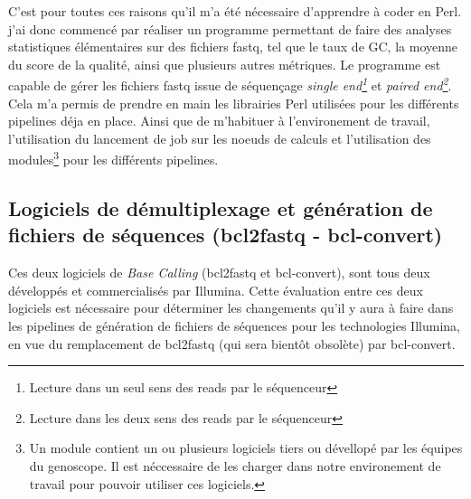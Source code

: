 C'est pour toutes ces raisons qu'il m'a été nécessaire d'apprendre à coder en Perl. j'ai donc commencé par réaliser un programme permettant de faire des analyses statistiques élémentaires sur des fichiers fastq, tel que le taux de GC, la moyenne du score de la qualité, ainsi que plusieurs autres métriques. Le programme est capable de gérer les fichiers fastq issue de séquençage \emph{single end\footnote{Lecture dans un seul sens des reads par le séquenceur}} et \emph{paired end\footnote{Lecture dans les deux sens des reads par le séquenceur}}. Cela m'a permis de prendre en main les librairies Perl utilisées pour les différents pipelines déja en place. Ainsi que de m'habituer à l'environement de travail, l'utilisation du lancement de job sur les noeuds de calculs et l'utilisation des modules\footnote{Un module contient un ou plusieurs logiciels tiers ou dévellopé par les équipes du genoscope. Il est néccessaire de les charger dans notre environement de travail pour pouvoir utiliser ces logiciels.} pour les différents pipelines.

\subsection{Logiciels de démultiplexage et génération de fichiers de séquences (bcl2fastq - bcl-convert)}
Ces deux logiciels de \emph{Base Calling} (bcl2fastq et bcl-convert), sont tous deux développés et commercialisés par Illumina. Cette évaluation entre ces deux logiciels est nécessaire pour déterminer les changements qu'il y aura à faire dans les pipelines de génération de fichiers de séquences pour les technologies Illumina, en vue du remplacement de bcl2fastq (qui sera bientôt obsolète) par bcl-convert.

